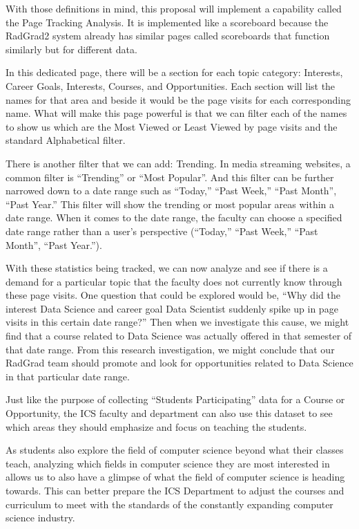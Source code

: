 \documentclass[english]{proposalnsf}
\begin{document}
  With those definitions in mind, this proposal will implement a capability called the Page Tracking Analysis. It is
  implemented like a scoreboard because the RadGrad2 system already has similar pages called scoreboards that function
  similarly but for different data.

  In this dedicated page, there will be a section for each topic category: Interests, Career Goals, Interests, Courses,
  and Opportunities. Each section will list the names for that area and beside it would be the page visits for each
  corresponding name. What will make this page powerful is that we can filter each of the names to show us which are
  the Most Viewed or Least Viewed by page visits and the standard Alphabetical filter.

  There is another filter that we can add: Trending. In media streaming websites, a common filter is ``Trending'' or
  ``Most Popular''. And this filter can be further narrowed down to a date range such as ``Today,''
  ``Past Week,'' ``Past Month'', ``Past Year.'' This filter will show the trending or most popular areas within a date
  range. When it comes to the date range, the faculty can choose a specified date range rather than a user's
  perspective (``Today,'' ``Past Week,'' ``Past Month'', ``Past Year.'').

  With these statistics being tracked, we can now analyze and see if there is a demand for a particular topic that the
  faculty does not currently know through these page visits. One question that could be explored would be, ``Why did
  the interest Data Science and career goal Data Scientist suddenly spike up in page visits in this certain
  date range?'' Then when we investigate this cause, we might find that a course related to Data Science was actually
  offered in that semester of that date range. From this research investigation, we might conclude that our RadGrad
  team should promote and look for opportunities related to Data Science in that particular date range.

  Just like the purpose of collecting ``Students Participating'' data for a Course or Opportunity, the ICS faculty and
  department can also use this dataset to see which areas they should emphasize and focus on teaching the students.

  As students also explore the field of computer science beyond what their classes teach, analyzing which fields in
  computer science they are most interested in allows us to also have a glimpse of what the field of computer science
  is heading towards. This can better prepare the ICS Department to adjust the courses and curriculum to meet with the
  standards of the constantly expanding computer science industry.
\end{document}
